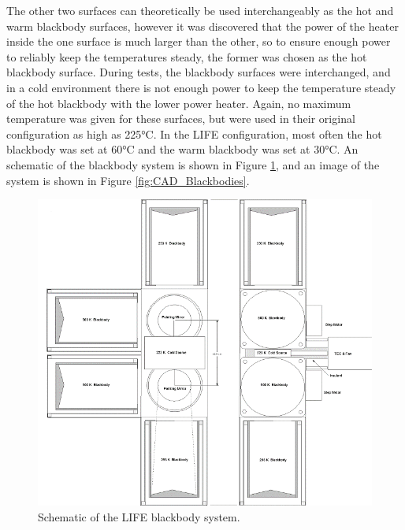 The other two surfaces can theoretically be used interchangeably as the hot and warm blackbody surfaces, however it was discovered that the power of the heater inside the one surface is much larger than the other, so to ensure enough power to reliably keep the temperatures steady, the former was chosen as the hot blackbody surface. During tests, the blackbody surfaces were interchanged, and in a cold environment there is not enough power to keep the temperature steady of the hot blackbody with the lower power heater. Again, no maximum temperature was given for these surfaces, but were used in their original configuration as high as 225°C. In the LIFE configuration, most often the hot blackbody was set at 60°C and the warm blackbody was set at 30°C. An schematic of the blackbody system is shown in Figure \ref{fig:bb_schematic}, and an image of the  system is shown in Figure \ref{fig:CAD_Blackbodies}.

\begin{figure}
    \centering
    \includegraphics{chap3_images/Blackbody_schematic.png}
    \caption{Schematic of the LIFE blackbody system.}
    \label{fig:bb_schematic}
\end{figure}

